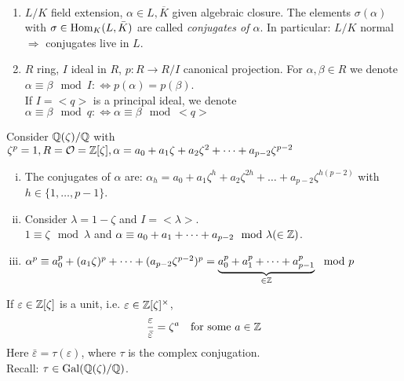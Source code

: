 \begin{Not}\
\begin{enumerate}
\item $L / K$ field extension, $\alpha \in L, \overline{K}$ given algebraic closure. The elements $\sigma (\alpha)$ with $\sigma \in \operatorname{Hom}_K(L, \bar{K})$ are called \emph{conjugates of $\alpha$}. In particular: $L/K$ normal $\Rightarrow$ conjugates live in $L$.
\item $R$ ring, $I$ ideal in $R$, $p: R \to R/I$ canonical projection. For $\alpha, \beta \in R$ we denote $\alpha \equiv \beta \mod I : \iff p(\alpha)=p(\beta)$.\\
If $I=<q>$ is a principal ideal, we denote $\alpha \equiv \beta \mod q :\iff \alpha \equiv \beta \mod <q>$
\end{enumerate}

\begin{Bsp}
Consider $\mathbb{Q}(\zeta)/\mathbb{Q}$ with $\zeta^p=1, R=\mathcal{O}=\mathbb{Z}[\zeta], \alpha = a_0 + a_1\zeta+a_2\zeta^2+\dots+a_{p-2}\zeta^{p-2}$
\begin{enumerate}[i)]
\item The conjugates of $\alpha$ are: $\alpha_h=a_0+a_1\zeta^h+ a_2\zeta^{2h}+\dots+a_{p-2}\zeta^{h(p-2)}$ with $h \in \{1, \dots, p-1\}$.
\item Consider $\lambda = 1- \zeta$ and $I=<\lambda>$.\\
$1 \equiv \zeta \mod \lambda$ and $\alpha \equiv a_0 + a_1 + \dots + a_{p-2} \mod \lambda (\in \mathbb{Z})$.
\item $\alpha^p \equiv a_0^p+(a_1 \zeta)^p+\dots + (a_{p-2} \zeta^{p-2})^p= \underbrace{a_0^p + a_1^p + \dots + a_{p-1}^p}_{\in \mathbb{Z}} \mod p$
\end{enumerate}
\end{Bsp}
\end{Not}

\begin{Satz}
If $\varepsilon \in \mathbb{Z}[\zeta]$ is a unit, i.e. $\varepsilon \in \mathbb{Z}[\zeta]^\times$,
\[ \frac{\varepsilon}{\bar{\varepsilon}}=\zeta^a \quad \text{for some } a \in \mathbb{Z}\]
Here $\bar{\varepsilon}= \tau (\varepsilon)$, where $\tau$ is the complex conjugation.\\
Recall: $\tau \in \operatorname{Gal}(\mathbb{Q}(\zeta)/\mathbb{Q})$.
\end{Satz}

